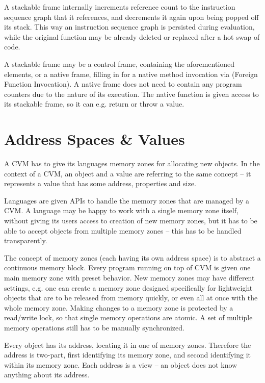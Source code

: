 A stackable frame internally increments reference count to the instruction sequence graph that it references, and decrements it again upon being popped off its stack. This way an instruction sequence graph is persisted during evaluation, while the original function may be already deleted or replaced after a hot swap of code. 

A stackable frame may be a control frame, containing the aforementioned elements, or a native frame, filling in for a native method invocation via  (Foreign Function Invocation). A native frame does not need to contain any program counters due to the nature of its execution. The native function is given access to its stackable frame, so it can e.g. return or throw a value. 






\section{Address Spaces \& Values}

A CVM has to give its languages memory zones for allocating new objects. In the context of a CVM, an object and a value are referring to the same concept -- it represents a value that has some address, properties and size. 

Languages are given APIs to handle the memory zones that are managed by a CVM. A language may be happy to work with a single memory zone itself, without giving its users access to creation of new memory zones, but it has to be able to accept objects from multiple memory zones -- this has to be handled transparently. 

The concept of memory zones (each having its own address space) is to abstract a continuous memory block. Every program running on top of CVM is given one main memory zone with preset behavior. New memory zones may have different settings, e.g. one can create a memory zone designed specifically for lightweight objects that are to be released from memory quickly, or even all at once with the whole memory zone. Making changes to a memory zone is protected by a read/write lock, so that single memory operations are atomic. A set of multiple memory operations still has to be manually synchronized. 

Every object has its address, locating it in one of memory zones. Therefore the address is two-part, first identifying its memory zone, and second identifying it within its memory zone. Each address is a view -- an object does not know anything about its address. 

